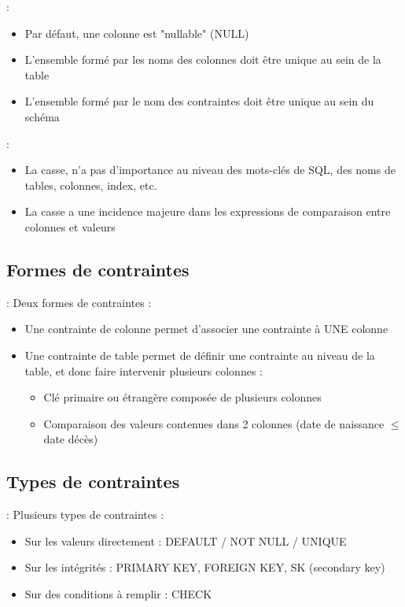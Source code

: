 \documentclass[10pt]{beamer}
\begin{document}
\begin{frame}{\secname : \subsecname}
    \begin{itemize}
        \item Par défaut, une colonne est "nullable" (NULL)
        \item L'ensemble formé par les noms des colonnes doit être unique au sein de la table
        \item L'ensemble formé par le nom des contraintes doit être unique au sein du schéma
    \end{itemize}
\end{frame}

\begin{frame}{\secname : \subsecname}
    \begin{itemize}
        \item La casse, n'a pas d'importance au niveau des mots-clés de SQL, des noms de tables, colonnes, index, etc.
        \item La casse a une incidence majeure dans les expressions de comparaison entre colonnes et valeurs
    \end{itemize}
\end{frame}
\subsection{Formes de contraintes}
\begin{frame}{\secname : \subsecname}
    Deux formes de contraintes :
    \begin{itemize}
        \item Une contrainte de colonne permet d’associer une contrainte à UNE colonne
        \item Une contrainte de table permet de définir une contrainte au niveau de la table, et donc faire intervenir plusieurs colonnes :
              \begin{itemize}
                  \item Clé primaire ou étrangère composée de plusieurs colonnes
                  \item Comparaison des valeurs contenues dans 2 colonnes (date de naissance $\leq$ date décès)
              \end{itemize}
    \end{itemize}
\end{frame}

\subsection{Types de contraintes}
\begin{frame}{\secname : \subsecname}
    Plusieurs types de contraintes :
    \begin{itemize}
        \item Sur les valeurs directement : DEFAULT / NOT NULL / UNIQUE
        \item Sur les intégrités : PRIMARY KEY, FOREIGN KEY, SK (secondary key)
        \item Sur des conditions à remplir : CHECK
    \end{itemize}
\end{frame}
\end{document}
